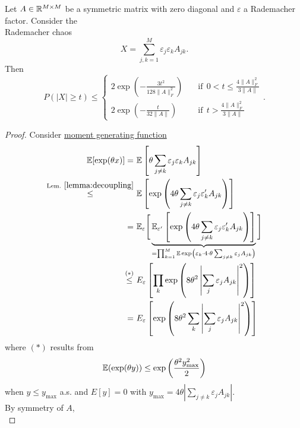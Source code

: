 \begin{theorem}
\begin{mdframed}
Let $A \in \mathbb{R}^{M\times M}$ be a symmetric matrix with zero diagonal and $\varepsilon$ a Rademacher factor. Consider the\\ Rademacher chaos 
\begin{equation*}
X = \sum_{j,k=1}^M \varepsilon_j \varepsilon_k A_{jk}.
\end{equation*}
Then
\begin{equation*}
P(|X|\geq t) \leq \begin{cases}
2 \exp \left(-
\frac{3t^2}{128\|A\|_F^2}
\right) \quad &\text{if}\ \  0<t\leq \frac{4\|A\|_F^2}{3\|A\|}\\
2\exp \left(
- \frac{t}{32\|A\|}
\right) \quad & \text{if}\ \   t > \frac{4\|A\|_F^2}{3\|A\|}
\end{cases}.
\end{equation*}
\end{mdframed}
\begin{proof}
Consider \underline{moment generating function}
\begin{equation*}
\begin{split}
\mathbb{E} [\exp (\theta x)] =\  & \mathbb{E} \left[ \theta \sum_{j\neq k} \varepsilon_j \varepsilon_k A_{jk} \right] \\
\overset{\text{Lem. } \ref{lemma:decoupling}}{\leq} \ & \mathbb{E} \left[
\exp \left(
4 \theta \sum_{j\neq k}\varepsilon_j \varepsilon'_k A_{jk}
\right)
\right]  \\
= \ &
\mathbb{E}_\varepsilon \Bigg[ \underbrace{\mathbb{E}_{\varepsilon'}\left[
\exp  \left( 4\theta \sum_{j\neq k}\varepsilon_j \varepsilon'_k A_{jk} \right) 
\right]}_{= \prod_{k=1}^M \mathbb{E} \exp \left( 
\varepsilon_k \cdot 4 \cdot  \theta \sum_{j \neq k} \varepsilon_j A_{jk}
\right)}
\Bigg] \\
\overset{(*)}\leq \ &
E_\varepsilon \left[
\prod_k\exp\left(
8\theta^2 \left| \sum_{j}\varepsilon_j A_{jk} \right|^2
\right)
\right]\\
=\ & E_\varepsilon \left[
\exp\left(
8\theta^2 \sum_k \left| \sum_{j}\varepsilon_j A_{jk} \right|^2
\right)
\right]
\end{split}
\end{equation*}
where $(*)$ results from 
$$
\mathbb{E} (\exp(\theta y)) \leq \exp \left( 
\frac{\theta^2 y^2_{\max}}{2}
\right)
$$
when $y\leq y_{\max}$ a.s. and $E[y]=0$ with $y_{\max}=4\theta \left| \sum_{j\neq k} \varepsilon_j A_{jk} \right|$. \\
By symmetry of $A$,
\begin{equation*}

\end{equation*}
\end{proof}
\end{theorem}
